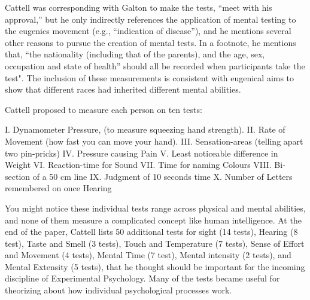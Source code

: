 \documentclass[
  oneside,
  12pt]{crumpbook}
\begin{document}
Cattell was corresponding with Galton to make the tests, ``meet with his approval,'' but he only indirectly references the application of mental testing to the eugenics movement (e.g., ``indication of disease''), and he mentions several other reasons to pursue the creation of mental tests. In a footnote, he mentions that, ``the nationality (including that of the parents), and the age, sex, occupation and state of health'' should all be recorded when participants take the test". The inclusion of these measurements is consistent with eugenical aims to show that different races had inherited different mental abilities.

Cattell proposed to measure each person on ten tests:

I. Dynamometer Pressure, (to measure squeezing hand strength).
II. Rate of Movement (how fast you can move your hand).
III. Sensation-areas (telling apart two pin-pricks)
IV. Pressure causing Pain
V. Least noticeable difference in Weight
VI. Reaction-time for Sound
VII. Time for naming Colours
VIII. Bi-section of a 50 cm line
IX. Judgment of 10 seconds time
X. Number of Letters remembered on once Hearing

You might notice these individual tests range across physical and mental abilities, and none of them measure a complicated concept like human intelligence. At the end of the paper, Cattell lists 50 additional tests for sight (14 tests), Hearing (8 test), Taste and Smell (3 tests), Touch and Temperature (7 tests), Sense of Effort and Movement (4 tests), Mental Time (7 test), Mental intensity (2 tests), and Mental Extensity (5 tests), that he thought should be important for the incoming discipline of Experimental Psychology. Many of the tests became useful for theorizing about how individual psychological processes work.
\end{document}

